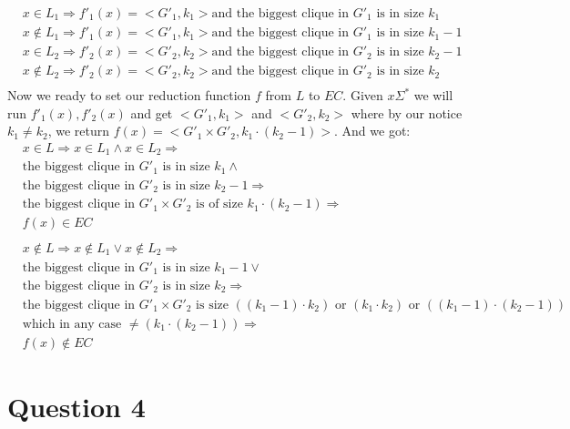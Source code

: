 \documentclass[11pt]{article}
\theoremstyle{plain}
\theoremstyle{nonumberplainnobrackets}
\begin{document}
\begin{align*}
&x\in L_1 \Rightarrow  f'_1(x)=<G'_1,k_1> \text{and the biggest clique in }G'_1\text{ is in size }k_1\\
&x\notin L_1 \Rightarrow  f'_1(x)=<G'_1,k_1> \text{and the biggest clique in }G'_1\text{ is in size }k_1-1 \\
&x \in L_2 \Rightarrow  f'_2(x)=<G'_2,k_2> \text{and the biggest clique in }G'_2\text{ is in size }k_2-1 \\
&x\notin L_2 \Rightarrow   f'_2(x)=<G'_2,k_2> \text{and the biggest clique in }G'_2\text{ is in size }k_2  \\
\end{align*}
Now we ready to set our reduction function $f$ from $L$ to $EC$. Given $x\Sigma^*$ we will run $f'_1(x),f'_2(x)$ and get $<G'_1,k_1>$ and $<G'_2,k_2>$ where by our notice $k_1\ne k_2$, we return $f(x) =<G'_1\times G'_2,k_1\cdot (k_2-1)>$. And we got:
\begin{align*}
&x\in L \Rightarrow x\in L_1 \wedge x \in L_2 \Rightarrow \\
& \text{the biggest clique in }G'_1\text{ is in size }k_1 \wedge \\
&\text{the biggest clique in }G'_2\text{ is in size }k_2-1 \Rightarrow\\
& \text{the biggest clique in  } G'_1\times G'_2  \text{ is of size } k_1\cdot (k_2-1) \Rightarrow\\
& f(x)\in EC\\
\\
&x\notin L \Rightarrow x\notin L_1 \vee x \notin L_2 \Rightarrow \\
& \text{the biggest clique in }G'_1\text{ is in size }k_1-1 \vee \\
&\text{the biggest clique in }G'_2\text{ is in size }k_2 \Rightarrow\\
& \text{the biggest clique in  } G'_1\times G'_2  \text{ is size } ((k_1-1)\cdot k_2) \text{ or } (k_1\cdot k_2) \text{ or } ((k_1-1)\cdot (k_2-1)) \\
&\text{which in any case } \ne (k_1\cdot (k_2-1)) \Rightarrow\\
& f(x)\notin EC
\end{align*}
\newpage
\section*{Question 4}
\end{document}
